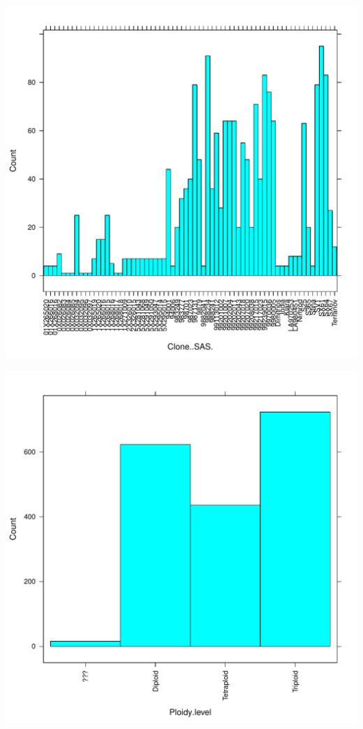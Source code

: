 \documentclass{article}\usepackage[]{graphicx}\usepackage[]{color}
\makeatletter
\def\maxwidth{ %
  \ifdim\Gin@nat@width>\linewidth
    \linewidth
  \else
    \Gin@nat@width
  \fi
}
\newenvironment{knitrout}{}{} %
\makeatother
\begin{document}
\begin{knitrout}
{}




{\centering \includegraphics[width=\maxwidth]{figure/HistogramsPredictorVariables-5} 

}




{\centering \includegraphics[width=\maxwidth]{figure/HistogramsPredictorVariables-6} 

}
\end{knitrout}
\end{document}
